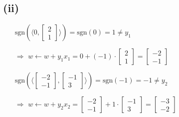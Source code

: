 \documentclass[12pt]{article}
\begin{document}
\subsection*{(ii)}
\begin{itemize}
\item[] $\text{sgn}(\langle 0, \begin{bmatrix} 2 \\ 1 \end{bmatrix}\rangle)
=\text{sgn}(0)=1\neq y_1$
\item[$\Rightarrow$] $w\leftarrow w+y_1x_1 = 0 + (-1)\cdot\begin{bmatrix} 2 \\ 1 \end{bmatrix} 
= \begin{bmatrix} -2 \\ -1 \end{bmatrix}$
\item[] $\text{sgn}(\langle \begin{bmatrix} -2 \\ -1 \end{bmatrix}, \begin{bmatrix} -1 \\ 3 \end{bmatrix}\rangle)
=\text{sgn}(-1)=-1\neq y_2$
\item[$\Rightarrow$] $w\leftarrow w+y_2x_2 = \begin{bmatrix} -2 \\ -1 \end{bmatrix} + 1\cdot\begin{bmatrix} -1 \\ 3 \end{bmatrix} 
= \begin{bmatrix} -3 \\ -2 \end{bmatrix}$
\end{itemize}
\end{document}
